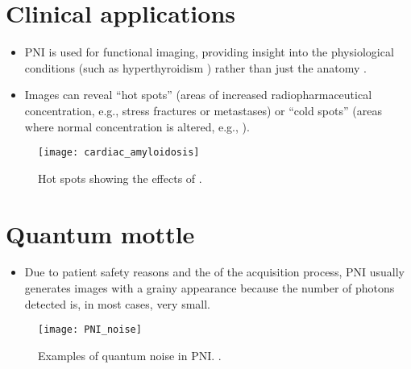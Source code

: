 \section{Clinical applications}
\begin{itemize}
\item PNI is used for functional imaging, providing insight into the
  physiological conditions (such as hyperthyroidism
  \cite{abdulla2025molecular_imaging}) rather than just the anatomy
  \cite{bushberg2011essential}.
\item Images can reveal ``hot spots'' (areas of increased
  radiopharmaceutical concentration, e.g., stress fractures or
  metastases) or ``cold spots'' (areas where normal concentration is
  altered, e.g., ).
\end{itemize}
\vspace{-4ex}
\begin{figure}[!b]
  \centering
  \texttt{[image: cardiac\_amyloidosis]}
  \caption{Hot spots showing the effects of 
    \cite{MNT_effects_cardiac_amyloidosis}.\label{fig:hot_spots}}
\end{figure}

\section{Quantum mottle}
\begin{itemize}
\item Due to patient safety reasons and the  of the
  acquisition process, PNI usually generates images with a grainy
  appearance because the number of photons detected is, in most cases,
  very small.
\end{itemize}
\vspace{-4ex}
\begin{figure}[!b]
  \centering
  \texttt{[image: PNI\_noise]}
  \caption{Examples of quantum noise in \gls{PNI}.
    \cite{saridin2007quantitative}.}
  \label{PNI_noise}
\end{figure}

